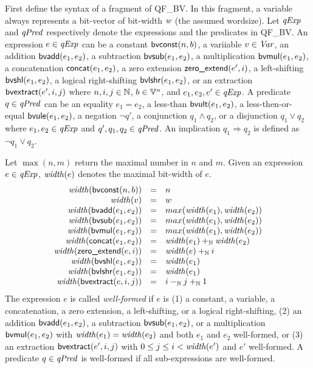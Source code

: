 
First define the syntax of a fragment of QF\_BV.
In this fragment, a variable always represents a bit-vector of bit-width $\mathit{w}$ (the assumed wordsize).
Let $\mathit{qExp}$ and $\mathit{qPred}$ respectively denote the expressions and the predicates in QF\_BV.
An expression $e \in \mathit{qExp}$ can be a constant $\mbox{\textsf{bvconst}}(n, b)$, a variiable $v \in \mathit{Var}$, an addition $\mbox{\textsf{bvadd}}(e_1, e_2)$, a subtraction $\mbox{\textsf{bvsub}}(e_1, e_2)$, a multiplication $\mbox{\textsf{bvmul}}(e_1, e_2)$, a concatenation $\mbox{\textsf{concat}}(e_1, e_2)$, a zero extension $\mbox{\textsf{zero\_extend}}(e', i)$, a left-shifting $\mbox{\textsf{bvshl}}(e_1, e_2)$, a logical right-shifting $\mbox{\textsf{bvlshr}}(e_1, e_2)$, or an extraction $\mbox{\textsf{bvextract}}(e', i, j)$ where $n, i, j \in \mathbb{N}$, $b \in \mathbb{V}^n$, and $e_1, e_2, e' \in \mathit{qExp}$.
A predicate $q \in \mathit{qPred}$ can be an equality $e_1 = e_2$, a less-than $\mbox{\textsf{bvult}}(e_1, e_2)$, a less-then-or-equal $\mbox{\textsf{bvule}}(e_1, e_2)$, a negation $\neg q'$, a conjunction $q_1 \wedge q_2$, or a disjunction $q_1 \vee q_2$ where $e_1, e_2 \in \mathit{qExp}$ and $q', q_1, q_2 \in \mathit{qPred}$.
An implication $q_1 \Rightarrow q_2$ is defined as $\neg q_1 \vee q_2$.

Let $\max(n, m)$ return the maximal number in $n$ and $m$.
Given an expression $e \in \mathit{qExp}$, $\mathit{width}(e)$ denotes the maximal bit-width of $e$.
\[
\begin{array}{rcl}
\mathit{width}(\mbox{\textsf{bvconst}}(n, b)) & = & n \\
\mathit{width}(v) & = & w \\
\mathit{width}(\mbox{\textsf{bvadd}}(e_1, e_2)) & = & max(\mathit{width}(e_1), \mathit{width}(e_2))\\
\mathit{width}(\mbox{\textsf{bvsub}}(e_1, e_2)) & = & max(\mathit{width}(e_1), \mathit{width}(e_2))\\
\mathit{width}(\mbox{\textsf{bvmul}}(e_1, e_2)) & = & max(\mathit{width}(e_1), \mathit{width}(e_2))\\
\mathit{width}(\mbox{\textsf{concat}}(e_1, e_2)) & = & \mathit{width}(e_1) +_{\mathbb{N}} \mathit{width}(e_2)\\
\mathit{width}(\mbox{\textsf{zero\_extend}}(e, i)) & = & \mathit{width}(e) +_{\mathbb{N}} i \\
\mathit{width}(\mbox{\textsf{bvshl}}(e_1, e_2)) & = & \mathit{width}(e_1) \\
\mathit{width}(\mbox{\textsf{bvlshr}}(e_1, e_2)) & = & \mathit{width}(e_1) \\
\mathit{width}(\mbox{\textsf{bvextract}}(e, i, j)) & = & i -_{\mathbb{N}} j +_{\mathbb{N}} 1 \\
\end{array}
\]
The expression $e$ is called \emph{well-formed} if $e$ is (1) a constant, a variable, a concatenation, a zero extension, a left-shifting, or a logical right-shifting, (2) an addition $\mbox{\textsf{bvadd}}(e_1, e_2)$, a subtraction $\mbox{\textsf{bvsub}}(e_1, e_2)$, or a multiplication $\mbox{\textsf{bvmul}}(e_1, e_2)$ with $\mathit{width}(e_1) = \mathit{width}(e_2)$ and both $e_1$ and $e_2$ well-formed, or (3) an extraction $\mbox{\textsf{bvextract}}(e', i, j)$ with $0 \leq j \leq i < \mathit{width}(e')$ and $e'$ well-formed.
A predicate $q \in \mathit{qPred}$ is well-formed if all sub-expressions are well-formed.

